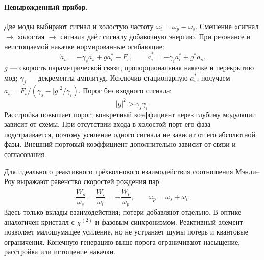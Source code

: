 \paragraph{Невырожденный прибор.}
Две моды выбирают сигнал и холостую частоту $\omega_i=\omega_p-\omega_s$. Смешение «сигнал $\to$ холостая $\to$ сигнал» даёт сигналу добавочную энергию. При резонансе и неистощаемой накачке нормированные огибающие:
\begin{equation}\label{eq:twomodeparam}
 \dot a_s=-\gamma_sa_s+ga_i^*+F_s,\qquad
 \dot a_i^*=-\gamma_ia_i^*+g^*a_s.
\end{equation}
$g$ --- скорость параметрической связи, пропорциональная накачке и перекрытию мод; $\gamma_j$ --- декременты амплитуд. Исключив стационарную $a_i^*$, получаем $a_s=F_s/(\gamma_s-|g|^2/\gamma_i)$. Порог без входного сигнала:
\begin{equation}
 |g|^2>\gamma_s\gamma_i.
\end{equation}
Расстройка повышает порог; конкретный коэффициент через глубину модуляции зависит от схемы. При отсутствии входа в холостой порт его фаза подстраивается, поэтому усиление одного сигнала не зависит от его абсолютной фазы. Внешний портовый коэффициент дополнительно зависит от связи и согласования.

Для идеального реактивного трёхволнового взаимодействия соотношения Мэнли--Роу выражают равенство скоростей рождения пар:
\begin{equation}
 \frac{\dot W_s}{\omega_s}=\frac{\dot W_i}{\omega_i}
 =-\frac{\dot W_p}{\omega_p},\qquad \omega_p=\omega_s+\omega_i.
\end{equation}
Здесь только вклады взаимодействия; потери добавляют отдельно. В оптике аналогичен кристалл с $\chi^{(2)}$ и фазовым синхронизмом. Реактивный элемент позволяет малошумящее усиление, но не устраняет шумы потерь и квантовые ограничения. Конечную генерацию выше порога ограничивают насыщение, расстройка или истощение накачки.
